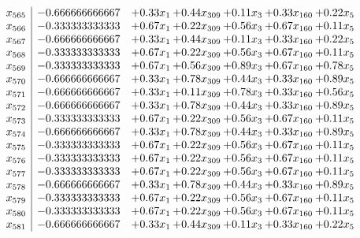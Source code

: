 \documentclass[8pt]{article}
\begin{document}
\[\begin{array}{c| c c@{\hskip 2pt} c@{\hskip 2pt} c@{\hskip 2pt} c@{\hskip 2pt} c@{\hskip 2pt} }
 x_{565}   &  -0.666666666667 & +  0.33 x_{1} & +  0.44 x_{309} & +  0.11 x_{3} & +  0.33 x_{160} & +  0.22 x_{5}\\
 x_{566}   &  -0.333333333333 & +  0.67 x_{1} & +  0.22 x_{309} & +  0.56 x_{3} & +  0.67 x_{160} & +  0.11 x_{5}\\
 x_{567}   &  -0.666666666667 & +  0.33 x_{1} & +  0.44 x_{309} & +  0.11 x_{3} & +  0.33 x_{160} & +  0.22 x_{5}\\
 x_{568}   &  -0.333333333333 & +  0.67 x_{1} & +  0.22 x_{309} & +  0.56 x_{3} & +  0.67 x_{160} & +  0.11 x_{5}\\
 x_{569}   &  -0.333333333333 & +  0.67 x_{1} & +  0.56 x_{309} & +  0.89 x_{3} & +  0.67 x_{160} & +  0.78 x_{5}\\
 x_{570}   &  -0.666666666667 & +  0.33 x_{1} & +  0.78 x_{309} & +  0.44 x_{3} & +  0.33 x_{160} & +  0.89 x_{5}\\
 x_{571}   &  -0.666666666667 & +  0.33 x_{1} & +  0.11 x_{309} & +  0.78 x_{3} & +  0.33 x_{160} & +  0.56 x_{5}\\
 x_{572}   &  -0.666666666667 & +  0.33 x_{1} & +  0.78 x_{309} & +  0.44 x_{3} & +  0.33 x_{160} & +  0.89 x_{5}\\
 x_{573}   &  -0.333333333333 & +  0.67 x_{1} & +  0.22 x_{309} & +  0.56 x_{3} & +  0.67 x_{160} & +  0.11 x_{5}\\
 x_{574}   &  -0.666666666667 & +  0.33 x_{1} & +  0.78 x_{309} & +  0.44 x_{3} & +  0.33 x_{160} & +  0.89 x_{5}\\
 x_{575}   &  -0.333333333333 & +  0.67 x_{1} & +  0.22 x_{309} & +  0.56 x_{3} & +  0.67 x_{160} & +  0.11 x_{5}\\
 x_{576}   &  -0.333333333333 & +  0.67 x_{1} & +  0.22 x_{309} & +  0.56 x_{3} & +  0.67 x_{160} & +  0.11 x_{5}\\
 x_{577}   &  -0.333333333333 & +  0.67 x_{1} & +  0.22 x_{309} & +  0.56 x_{3} & +  0.67 x_{160} & +  0.11 x_{5}\\
 x_{578}   &  -0.666666666667 & +  0.33 x_{1} & +  0.78 x_{309} & +  0.44 x_{3} & +  0.33 x_{160} & +  0.89 x_{5}\\
 x_{579}   &  -0.333333333333 & +  0.67 x_{1} & +  0.22 x_{309} & +  0.56 x_{3} & +  0.67 x_{160} & +  0.11 x_{5}\\
 x_{580}   &  -0.333333333333 & +  0.67 x_{1} & +  0.22 x_{309} & +  0.56 x_{3} & +  0.67 x_{160} & +  0.11 x_{5}\\
 x_{581}   &  -0.666666666667 & +  0.33 x_{1} & +  0.44 x_{309} & +  0.11 x_{3} & +  0.33 x_{160} & +  0.22 x_{5}\\

\end{array}\]
\end{document}
